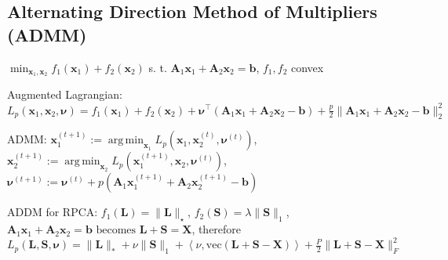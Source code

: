 \documentclass[a4paper, 11pt, landscape]{article}
\DeclareMathOperator*{\argmin}{arg\,min}
\begin{document}
\begin{multicols*}{3}
\subsection{Alternating Direction Method of Multipliers (ADMM)}
$\min_{\mathbf{x}_1, \mathbf{x}_2} f_1(\mathbf{x}_1) + f_2(\mathbf{x}_2)$ s. t. $\mathbf{A}_1 \mathbf{x}_1 + \mathbf{A}_2 \mathbf{x}_2 = \mathbf{b}$, $f_1, f_2$ convex
\begin{inparaitem}[\color{red}\textbullet]
	\item Augmented Lagrangian: $L_p(\mathbf{x}_1, \mathbf{x}_2, \boldsymbol{\nu}) = f_1(\mathbf{x}_1) + f_2(\mathbf{x}_2) + \boldsymbol{\nu}^\top (\mathbf{A}_1 \mathbf{x}_1 + \mathbf{A}_2 \mathbf{x}_2 - \mathbf{b}) + \frac{p}{2}\| \mathbf{A}_1 \mathbf{x}_1 + \mathbf{A}_2 \mathbf{x}_2 - \mathbf{b} \|_2^2$
	\item ADMM: $\mathbf{x}_1^{(t+1)} := \argmin_{\mathbf{x}_1} L_p(\mathbf{x}_1, \mathbf{x}_2^{(t)}, \boldsymbol{\nu}^{(t)})$, $\mathbf{x}_2^{(t+1)} := \argmin_{\mathbf{x}_2} L_p(\mathbf{x}_1^{(t+1)}, \mathbf{x}_2, \boldsymbol{\nu}^{(t)})$, $\boldsymbol{\nu}^{(t+1)} := \boldsymbol{\nu}^{(t)} + p(\mathbf{A}_1 \mathbf{x}_1^{(t+1)} + \mathbf{A}_2 \mathbf{x}_2^{(t+1)} - \mathbf{b})$
  \item ADDM for RPCA: $f_1(\mathbf{L}) = \|\mathbf{L}\|_\star$, $f_2(\mathbf{S}) = \lambda \| \mathbf{S} \|_1$, $\mathbf{A}_1 \mathbf{x}_1 + \mathbf{A}_2 \mathbf{x}_2 = \mathbf{b} \text{ becomes } \mathbf{L} + \mathbf{S} = \mathbf{X}$, therefore $L_p(\mathbf{L}, \mathbf{S}, \boldsymbol{\nu}) = \|\mathbf{L}\|_* + \nu \|\mathbf{S}\|_1 + \left< \nu, \mathrm{vec}(\mathbf{L}+\mathbf{S}-\mathbf{X}) \right> + \frac{P}{2} \| \mathbf{L}+ \mathbf{S} - \mathbf{X} \|_F^2$ 
\end{inparaitem}

\raggedcolumns
\end{multicols*}
\end{document}
